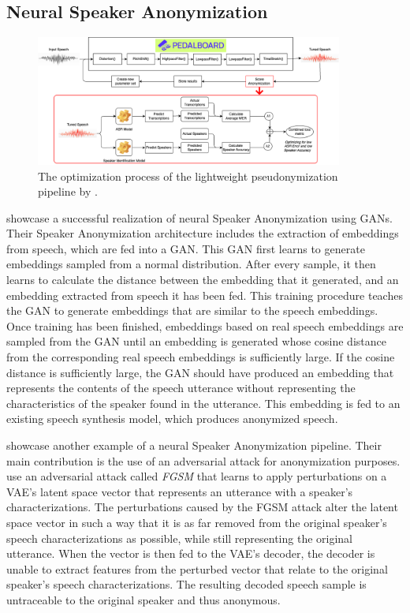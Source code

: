\documentclass[11pt]{article}
\begin{document}
\subsection{Neural Speaker Anonymization}
\begin{figure}
  \centering
  \includegraphics[width=0.9\textwidth]{roddeman_etal_optimization.png}
  \caption{The optimization process of the lightweight pseudonymization pipeline by \citet{roddeman2024anonymization}.}
  \label{fig:roddeman_etal_optimization}
\end{figure}

\citet{meyer2023anonymizing} showcase a successful realization of neural Speaker Anonymization using GANs.
Their Speaker Anonymization architecture includes the extraction of embeddings from speech, which are fed into a GAN.
This GAN first learns to generate embeddings sampled from a normal distribution.
After every sample, it then learns to calculate the distance between the embedding that it generated, and an embedding extracted from speech it has been fed.
This training procedure teaches the GAN to generate embeddings that are similar to the speech embeddings.
Once training has been finished, embeddings based on real speech embeddings are sampled from the GAN until an embedding is generated whose cosine distance from the corresponding real speech embeddings is sufficiently large.
If the cosine distance is sufficiently large, the GAN should have produced an embedding that represents the contents of the speech utterance without representing the characteristics of the speaker found in the utterance.
This embedding is fed to an existing speech synthesis model, which produces anonymized speech.

\citet{shihao2024adversarial} showcase another example of a neural Speaker Anonymization pipeline.
Their main contribution is the use of an adversarial attack for anonymization purposes.
\citeauthor{shihao2024adversarial} use an adversarial attack called \textit{FGSM} that learns to apply perturbations on a VAE's latent space vector that represents an utterance with a speaker's characterizations.
The perturbations caused by the FGSM attack alter the latent space vector in such a way that it is as far removed from the original speaker's speech characterizations as possible, while still representing the original utterance.
When the vector is then fed to the VAE's decoder, the decoder is unable to extract features from the perturbed vector that relate to the original speaker's speech characterizations.
The resulting decoded speech sample is untraceable to the original speaker and thus anonymous.
\end{document}
